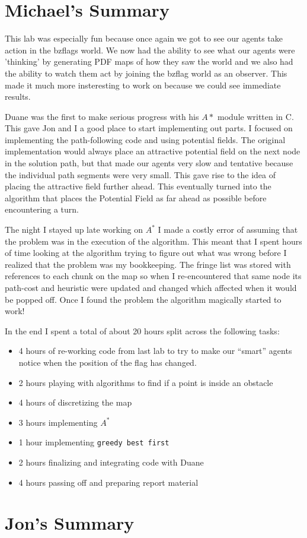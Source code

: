 \section{Michael's Summary}
This lab was especially fun because once again we got to see our agents take action in the bzflags world.  We now had the ability to see what our agents were 'thinking' by generating PDF maps of how they saw the world and we also had the ability to watch them act by joining the bzflag world as an observer.  This made it much more insteresting to work on because we could see immediate results.
\par
Duane was the first to make serious progress with his $A*$ module written in C.  This gave Jon and I a good place to start implementing out parts.  I focused on implementing the path-following code and using potential fields.  The original implementation would always place an attractive potential field on the next node in the solution path, but that made our agents very slow and tentative because the individual path segments were very small. This gave rise to the idea of placing the attractive field further ahead.  This eventually turned into the algorithm that places the Potential Field as far ahead as possible before encountering a turn.
\par
The night I stayed up late working on $A^*$ I made a costly error of assuming that the problem was in the execution of the algorithm.  This meant that I spent hours of time looking at the algorithm trying to figure out what was wrong before I realized that the problem was my bookkeeping.  The fringe list was stored with references to each chunk on the map so when I re-encountered that same node its path-cost and heuristic were updated and changed which affected when it would be popped off.  Once I found the problem the algorithm magically started to work!
\par
In the end I spent a total of about 20 hours split across the following tasks:
\begin{itemize}
    \item 4 hours of re-working code from last lab to try to make our ``smart'' agents notice when the position of the flag has changed.
    \item 2 hours playing with algorithms to find if a point is inside an obstacle
    \item 4 hours of discretizing the map
    \item 3 hours implementing $A^*$
    \item 1 hour implementing \texttt{greedy best first}
    \item 2 hours finalizing and integrating code with Duane
    \item 4 hours passing off and preparing report material
\end{itemize}

\section{Jon's Summary}